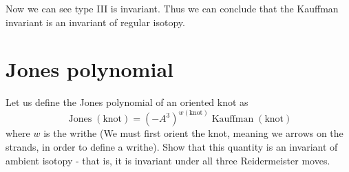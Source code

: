 Now we can see type III is invariant. Thus we can conclude that the Kauffman invariant is an invariant of regular isotopy.

\section{Jones polynomial}
Let us define the Jones polynomial of an oriented knot as
\begin{equation*}
\operatorname{Jones} (\text{knot} )=(-A^{3} )^{w(\text{knot} )}\operatorname{Kauffman} (\text{knot} )
\end{equation*}
where $w$ is the writhe (We must first orient the knot, meaning we arrows on the strands, in order to define a writhe). Show that this quantity is an invariant of ambient isotopy - that is, it is invariant under all three Reidermeister moves.

